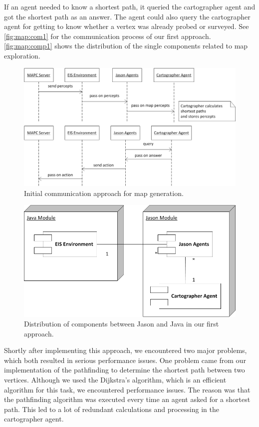 If an agent needed to know a shortest path, it queried the cartographer agent and got the shortest path as an answer.
The agent could also query the cartographer agent for getting to know whether a vertex was already probed or surveyed.
See \autoref{fig:map:com1} for the communication process of our first approach.
\autoref{fig:map:comp1} shows the distribution of the single components related to map exploration.
\begin{figure}
  \centering
  \includegraphics[width=\linewidth]{images/map_com_1.png}
  \caption{Initial communication approach for map generation.}
  \label{fig:map:com1}
\end{figure}

\begin{figure}
  \centering
  \includegraphics[width=0.7\linewidth]{images/map_comp_1.png}
  \caption{Distribution of components between Jason and Java in our first approach.}
  \label{fig:map:comp1}
\end{figure}

Shortly after implementing this approach, we encountered two major problems, which both resulted in serious performance issues.
One problem came from our implementation of the pathfinding to determine the shortest path between two vertices.
Although we used the Dijkstra's algorithm, which is an efficient algorithm for this task, we encountered performance issues.
The reason was that the pathfinding algorithm was executed every time an agent asked for a shortest path.
This led to a lot of redundant calculations and processing in the cartographer agent.

